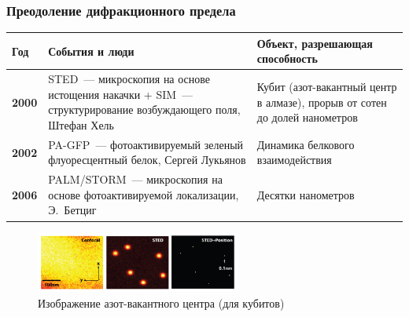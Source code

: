 \documentclass[9pt, compress, xcolor=table]{beamer}
\begin{document}
\begin{frame}[fragile]
  \frametitle{Преодоление дифракционного предела}
  
\begin{table}[htbp]
\begin{center}
\small
\arrayrulewidth=1pt
\begin{tabular}{|l|p{}|p{}|}
\hline
\cellcolor{gray!25}\textbf{Год} & 
\cellcolor{gray!25}\textbf{События и люди} & 
\cellcolor{gray!25}\textbf{Объект, разрешающая способность} \\ \hline
\textbf{2000} & 
STED~--- микроскопия на основе истощения накачки + SIM~---структурирование возбуждающего поля, Штефан Хель &
Кубит (азот-вакантный центр в алмазе), прорыв от сотен до долей нанометров \\ \hline
\textbf{2002} & 
PA-GFP~--- фотоактивируемый зеленый флуоресцентный белок, Сергей Лукьянов& Динамика белкового взаимодействия \\ \hline
\textbf{2006} &
PALM/STORM~--- микроскопия на основе фотоактивируемой локализации, Э.~Бетциг &
Десятки нанометров \\ \hline
\end{tabular}\label{tab4}
\end{center}
\end{table}
\begin{figure}
\centering
\includegraphics[width=0.6\textwidth]{diamond-stedL}
\\ Изображение азот-вакантного центра (для кубитов)
\end{figure}

\end{frame}
\end{document}
